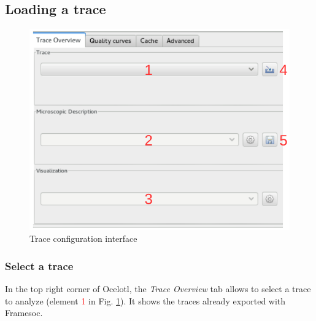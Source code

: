 \documentclass[twoside]{article}
\begin{document}
\begin{sloppypar}
\subsection{Loading a trace}
\begin{figure}[h!]
	\centering
	\includegraphics[scale=0.7]{images/traceSelection_labeled.pdf}
	\caption{Trace configuration interface}
	\label{traceConf}
\end{figure}

\subsubsection{Select a trace}

In the top right corner of Ocelotl, the \textit{Trace Overview} tab allows to select a trace to analyze (element \textcolor{red}{1} in Fig. \ref{traceConf}). It shows the traces already exported with Framesoc. 


\end{sloppypar}
\end{document}
